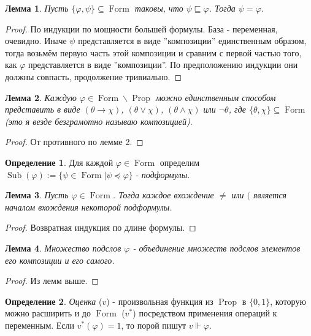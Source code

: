 \documentclass[a4paper,100pt]{article}
\theoremstyle{indented}
\newtheorem{lemma}{Лемма}
\theoremstyle{definition}
\newtheorem{defn}{Определение}
\theoremstyle{remark}
\DeclareMathOperator{\Prop}{Prop}
\DeclareMathOperator{\form}{Form}
\DeclareMathOperator{\Sub}{Sub}
\begin{document}
\begin{lemma}
  Пусть $\{\varphi , \psi\}\subseteq \form$ таковы, что $\psi \sqsubseteq \varphi$. Тогда $\psi = \varphi$. 
\end{lemma}

\begin{proof}
  По индукции по мощности большей формулы. База - переменная, очевидно. Иначе $\psi$ представляется в виде ''композиции'' единственным образом, тогда возьмём первую часть этой композиции и сравним с первой частью того, как $\varphi$ представляется в виде ''композиции''. По предположению индукции они должны совпасть, продолжение тривиально.
\end{proof}

\begin{lemma}
  Каждую $\varphi \in \form \backslash \Prop$ можно единственным способом представить в виде $(\theta \rightarrow \chi)$, $(\theta \vee \chi)$, $(\theta \wedge \chi)$ или $\neg\theta$, где $\{\theta, \chi\}\subseteq \form$ (это я везде безграмотно называю \textit{композицией}). 
\end{lemma}

\begin{proof}
  От противного по лемме 2.
\end{proof}

\begin{defn}
  Для каждой $\varphi\in \form$ определим $\Sub(\varphi):=\{\psi\in \form|\psi \preccurlyeq \varphi\}$ - \textit{подформулы}.
\end{defn}

\begin{lemma}
  Пусть $\varphi \in \form$. Тогда каждое вхождение $\neq$ или $($ является началом вхождения некоторой подформулы.
\end{lemma}

\begin{proof}
  Возвратная индукция по длине формулы.
\end{proof}

\begin{lemma}
  Множество подслов $\varphi$ - объединение множеств подслов элементов его композиции и его самого.
\end{lemma}

\begin{proof}
  Из лемм выше.
\end{proof}

\begin{defn}
  \textit{Оценка} ($v$) - произвольная функция из $\Prop$ в $\{0, 1\}$, которую можно расширить и до $\form$ ($v^*$) посредством применения операций к переменным. Если $v^*(\varphi)=1$, то порой пишут $v \Vdash \varphi$.
\end{defn}
\end{document}
